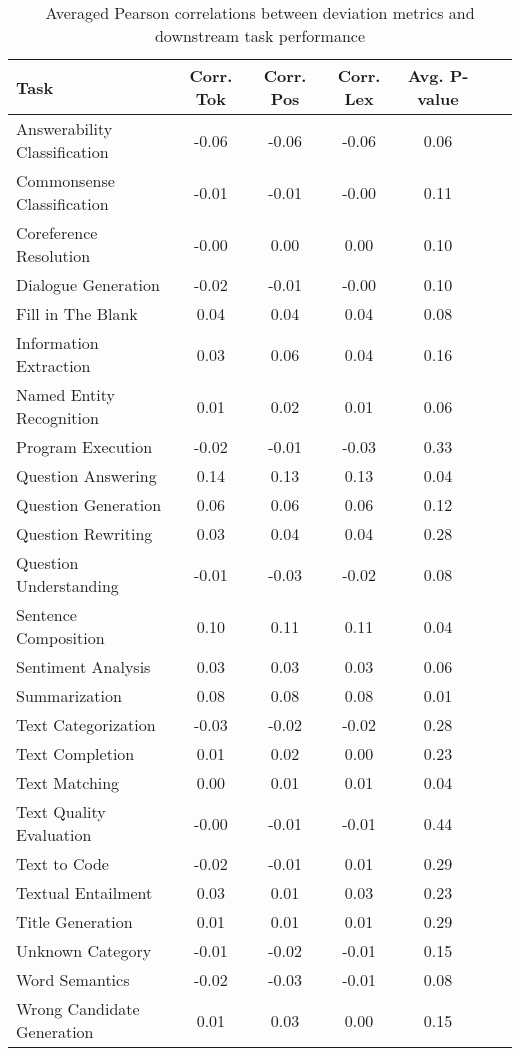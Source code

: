 \begin{table}
\caption{Averaged Pearson correlations between deviation metrics and downstream task performance}
\begin{tabular}{lcccccc}
\toprule
Task & Corr. Tok & Corr. Pos & Corr. Lex & Avg. P-value \\
\midrule
Answerability Classification & -0.06 & -0.06 & -0.06 & 0.06 \\
Commonsense Classification & -0.01 & -0.01 & -0.00 & 0.11 \\
Coreference Resolution & -0.00 & 0.00 & 0.00 & 0.10 \\
Dialogue Generation & -0.02 & -0.01 & -0.00 & 0.10 \\
Fill in The Blank & 0.04 & 0.04 & 0.04 & 0.08 \\
Information Extraction & 0.03 & 0.06 & 0.04 & 0.16 \\
Named Entity Recognition & 0.01 & 0.02 & 0.01 & 0.06 \\
Program Execution & -0.02 & -0.01 & -0.03 & 0.33 \\
Question Answering & 0.14 & 0.13 & 0.13 & 0.04 \\
Question Generation & 0.06 & 0.06 & 0.06 & 0.12 \\
Question Rewriting & 0.03 & 0.04 & 0.04 & 0.28 \\
Question Understanding & -0.01 & -0.03 & -0.02 & 0.08 \\
Sentence Composition & 0.10 & 0.11 & 0.11 & 0.04 \\
Sentiment Analysis & 0.03 & 0.03 & 0.03 & 0.06 \\
Summarization & 0.08 & 0.08 & 0.08 & 0.01 \\
Text Categorization & -0.03 & -0.02 & -0.02 & 0.28 \\
Text Completion & 0.01 & 0.02 & 0.00 & 0.23 \\
Text Matching & 0.00 & 0.01 & 0.01 & 0.04 \\
Text Quality Evaluation & -0.00 & -0.01 & -0.01 & 0.44 \\
Text to Code & -0.02 & -0.01 & 0.01 & 0.29 \\
Textual Entailment & 0.03 & 0.01 & 0.03 & 0.23 \\
Title Generation & 0.01 & 0.01 & 0.01 & 0.29 \\
Unknown Category & -0.01 & -0.02 & -0.01 & 0.15 \\
Word Semantics & -0.02 & -0.03 & -0.01 & 0.08 \\
Wrong Candidate Generation & 0.01 & 0.03 & 0.00 & 0.15 \\
\bottomrule
\end{tabular}
\end{table}
